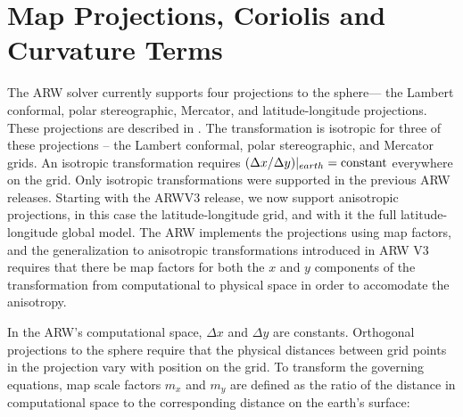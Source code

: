 \section{Map Projections, Coriolis and Curvature Terms}
\label{spherical_projections}

The ARW solver currently supports four projections to the sphere--- the
Lambert conformal, polar stereographic, Mercator, and latitude-longitude
projections.  These projections are described in
\citet{haltiner_and_williams}.  The transformation is isotropic for
three of these projections -- the Lambert conformal, polar stereographic,
and Mercator grids.  An isotropic transformation requires $(\Delta
x/\Delta y)|_{earth} = \hbox{constant}$ everywhere on the grid.  Only
isotropic transformations were supported in the previous ARW releases.
Starting with the ARWV3 release, we now support anisotropic
projections, in this case the latitude-longitude grid, and with it the
full latitude-longitude global model.  The ARW implements the
projections using map factors, and the generalization to anisotropic
transformations introduced in ARW V3 requires that there be map factors
for both the $x$ and $y$ components of the transformation from
computational to physical space in order to accomodate the anisotropy.

In the ARW's computational space, $\Delta x$ and $\Delta y$ are
constants.  Orthogonal projections to the sphere require that
the physical distances between grid points in the projection vary with
position on the grid.  To transform the governing equations,
map scale factors $m_x$ and $m_y$ are defined as the ratio of the distance 
in computational space to the corresponding distance on the earth's surface:

